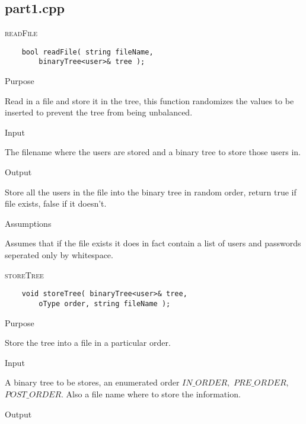 \documentclass[pdftex, 12pt]{article}
\begin{document}
\subsection{part1.cpp}
\begin{description}

	\item{\textsc{readFile}}
\begin{lstlisting}
	bool readFile( string fileName,
		binaryTree<user>& tree );
\end{lstlisting}
		\begin{description}

			\item{Purpose}

				Read in a file and store it in the tree, this function randomizes the values to be inserted to prevent
				the tree from being unbalanced.

			\item{Input}

				The filename where the users are stored and a binary tree to store those users in.

			\item{Output}

				Store all the users in the file into the binary tree in random order, return true if file exists, false
				if it doesn't.

			\item{Assumptions}

				Assumes that if the file exists it does in fact contain a list of users and passwords seperated only by
				whitespace.

		\end{description}
	\item{\textsc{storeTree}}
\begin{lstlisting}
	void storeTree( binaryTree<user>& tree,
		oType order, string fileName );
\end{lstlisting}
		\begin{description}

			\item{Purpose}

				Store the tree into a file in a particular order.

			\item{Input}

				A binary tree to be stores, an enumerated order
				$IN\_ORDER,$ 
				$PRE\_ORDER,$
				$POST\_ORDER$. Also a file name
				where to store the information.

			\item{Output}


\end{description}
\end{description}
\end{document}
